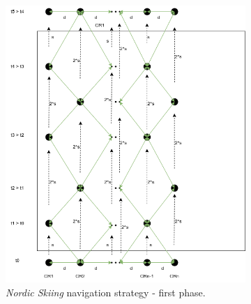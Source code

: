 \begin{figure}[h!]
	\centering
	\begin{subfigure}[t]{0.45\linewidth}
		\centering
		\includegraphics[width=\linewidth]{graphics/ski_nordique_1.png}
		\caption{\textit{Nordic Skiing} navigation strategy - first phase.}
		\label{fig:ski_nordique_1}
	\end{subfigure}
	\hfill
	\begin{subfigure}[t]{0.45\linewidth}
		\centering

\end{subfigure}
\end{figure}
